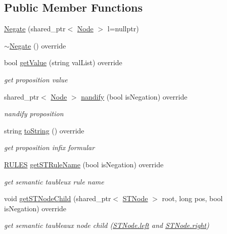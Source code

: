 \subsection*{Public Member Functions}
\begin{DoxyCompactItemize}
\item 
\hyperlink{class_negate_adb1a956d1f152e24fada7b1a33b0331e}{Negate} (shared\+\_\+ptr$<$ \hyperlink{class_node}{Node} $>$ l=nullptr)
\item 
\hyperlink{class_negate_a04d4e89273d5fcbfaad144df52e40041}{$\sim$\+Negate} () override
\item 
bool \hyperlink{class_negate_adc2bf29215e329e60e44dbf6bf8a4c85}{get\+Value} (string val\+List) override
\begin{DoxyCompactList}\small\item\em get proposition value \end{DoxyCompactList}\item 
shared\+\_\+ptr$<$ \hyperlink{class_node}{Node} $>$ \hyperlink{class_negate_a2dd4cada504739fea3583a5729044c71}{nandify} (bool is\+Negation) override
\begin{DoxyCompactList}\small\item\em nandify proposition \end{DoxyCompactList}\item 
string \hyperlink{class_negate_aab87b217ffd5c8ba404022a5f4cec220}{to\+String} () override
\begin{DoxyCompactList}\small\item\em get proposition infix formular \end{DoxyCompactList}\item 
\hyperlink{proposition_2tableaux_2enum_8h_a70c93904c6a27d228050f922eb4fc3b8}{R\+U\+L\+ES} \hyperlink{class_negate_ac881a233c5a1e6f7669ea8ff70eda8f7}{get\+S\+T\+Rule\+Name} (bool is\+Negation) override
\begin{DoxyCompactList}\small\item\em get semantic taubleux rule name \end{DoxyCompactList}\item 
void \hyperlink{class_negate_ad06cf6b9c1070a001919c58084990c0d}{get\+S\+T\+Node\+Child} (shared\+\_\+ptr$<$ \hyperlink{class_s_t_node}{S\+T\+Node} $>$ root, long pos, bool is\+Negation) override
\begin{DoxyCompactList}\small\item\em get semantic taubleaux node child (\hyperlink{class_s_t_node_a19ba8bab4660bdeee0e897687b451a8b}{S\+T\+Node.\+left} and \hyperlink{class_s_t_node_a66d06118063fb739058f91c75b725e27}{S\+T\+Node.\+right}) \end{DoxyCompactList}\item 

\end{DoxyCompactItemize}
